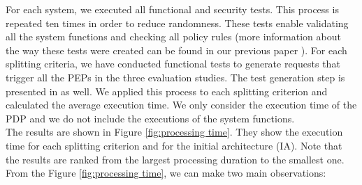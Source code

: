 
For each system, we executed all functional and security tests. This process is repeated ten times in order to reduce randomness.
These tests enable validating all the system functions and checking all policy rules (more information 
about the way these tests were created can be found in our previous paper \cite{testcase}).  
For each splitting criteria, we have conducted functional tests to generate 
requests that trigger all the PEPs in the three evaluation studies. The test generation step is presented in \cite{testcase} as well.
We applied this process to each splitting criterion and calculated the average execution time. We only consider the execution time of the PDP and we do not include the executions of the system functions. 
\\
The results are shown in Figure \ref{fig:processing time}. They show the execution time for each splitting criterion and for the initial architecture (IA).
Note that the results are ranked from the largest processing duration to the smallest one. From the Figure \ref{fig:processing time}, we can make two main observations:


